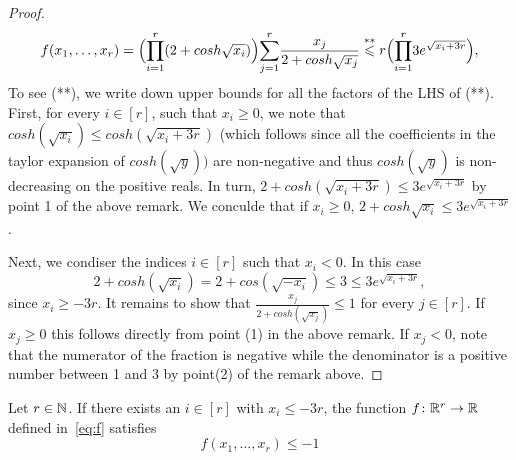 \begin{proof} 
  \begin{equation*}
    f(x_1,\dots,x_r)= \Bigl(\overunderset{r}{i=1}{\prod}(2+cosh\sqrt{x_i})\Bigr)\overunderset{r}{j=1}{\sum}\frac{x_j}{2+cosh \sqrt{x_j}}
     \overset{**}{\leq}r\Bigl(\overunderset{r}{i=1}{\prod} 3e^{\sqrt{x_i+3r}}\Bigr),
  \end{equation*}
To see (**), we write down upper bounds for all the factors of the LHS of (**).
First, for every $i \in [r]$, such that $x_i \geq 0$, we note that $cosh(\sqrt{x_i} )\leq cosh(\sqrt{x_i+3r})$ (which follows since all
the coefficients in the taylor expansion of $cosh(\sqrt{y}))$ are non-negative and thus $cosh(\sqrt{y})$ is non-decreasing on the positive reals.
In turn, $2+cosh(\sqrt{x_i+3r}) \leq 3e^{\sqrt{x_i+3r}}$ by point 1 of the above remark. We conculde that if $x_i \geq 0$, 
$2 + cosh{\sqrt{x_i}} \leq 3 e^{\sqrt{x_i+3r}}$.

Next, we condiser the indices $i \in [r]$ such that $x_i<0$. In this case \begin{equation*}
  2+cosh(\sqrt{x_i})= 2 + cos(\sqrt{-x_i}) \leq 3 \leq 3 e^{\sqrt{x_i+3r}},
\end{equation*} 
since $x_i \geq -3r$. 
It remains to show that $\frac{x_j}{2+cosh(\sqrt{x_j})} \leq 1$ for every $j \in [r]$. If $x_j\geq 0$ this follows directly from point (1) in the above remark.
If $x_j<0$, note that the numerator of the fraction is negative while the denominator is a positive number between 1 and 3 by point(2) of the remark above.
 
\end{proof}


\begin{lemma}
  \label{lem:special-function-ec}
  Let $r \in \mathbb{N}$. If there exists an $i \in [r]$ with $x_i \le - 3r$, the function $f \colon \mathbb{R}^r \rightarrow \mathbb{R}$ defined in~\eqref{eq:f} satisfies
  $$
  f(x_1,\dots,x_r) \le -1$$
\end{lemma}

